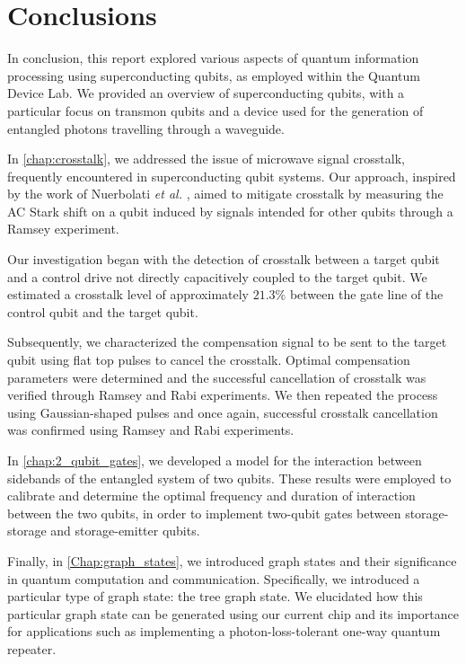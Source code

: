 \chapter*{Conclusions}
\label{chap:conclusions}
\thispagestyle{fancy}

In conclusion, this report explored various aspects of quantum information processing using superconducting qubits, as employed within the Quantum Device Lab. 
We provided an overview of superconducting qubits, with a particular focus on transmon qubits and a device used for the generation of entangled photons travelling through a waveguide.

In \cref{chap:crosstalk}, we addressed the issue of microwave signal crosstalk, frequently encountered in superconducting qubit systems.
Our approach, inspired by the work of Nuerbolati \emph{et al.} \cite{crosstalk}, aimed to mitigate crosstalk by measuring the AC Stark shift on a qubit induced by signals intended for other qubits through a Ramsey experiment.

Our investigation began with the detection of crosstalk between a target qubit and a control drive not directly capacitively coupled to the target qubit.
We estimated a crosstalk level of approximately $21.3\%$ between the gate line of the control qubit and the target qubit.

Subsequently, we characterized the compensation signal to be sent to the target qubit using flat top pulses to cancel the crosstalk.
Optimal compensation parameters were determined and the successful cancellation of crosstalk was verified through Ramsey and Rabi experiments.
We then repeated the process using Gaussian-shaped pulses and once again, successful crosstalk cancellation was confirmed using Ramsey and Rabi experiments.

In \cref{chap:2_qubit_gates}, we developed a model for the interaction between sidebands of the entangled system of two qubits. 
These results were employed to calibrate and determine the optimal frequency and duration of interaction between the two qubits, in order to implement two-qubit gates between storage-storage and storage-emitter qubits.

Finally, in \cref{Chap:graph_states}, we introduced graph states and their significance in quantum computation and communication.
Specifically, we introduced a particular type of graph state: the tree graph state.
We elucidated how this particular graph state can be generated using our current chip and its importance for applications such as implementing a photon-loss-tolerant one-way quantum repeater.
